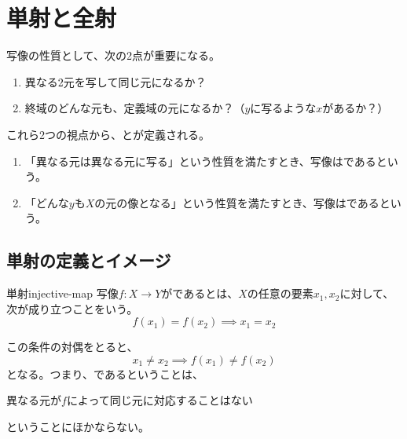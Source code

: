 \documentclass[../../../topic_linear-algebra]{subfiles}
\begin{document}
\sectionline
\section{単射と全射}

写像の性質として、次の2点が重要になる。
\begin{enumerate}[label=\romanlabel]
  \item 異なる2元を写して同じ元になるか？
  \item 終域のどんな元も、定義域の元になるか？（$y$に写るような$x$があるか？）
\end{enumerate}

これら2つの視点から、とが定義される。
\begin{enumerate}[label=\romanlabel]
  \item 「異なる元は異なる元に写る」という性質を満たすとき、写像はであるという。
  \item 「どんな$y$も$X$の元の像となる」という性質を満たすとき、写像はであるという。
\end{enumerate}

\subsection{単射の定義とイメージ}

\begin{definition}{単射}{injective-map}
  写像$f\colon X \to Y$がであるとは、$X$の任意の要素$x_1, x_2$に対して、次が成り立つことをいう。
  \begin{equation*}
    f(x_1) = f(x_2) \implies x_1 = x_2
  \end{equation*}
\end{definition}

この条件の対偶をとると、
\begin{equation*}
  x_1 \ne x_2 \implies f(x_1) \ne f(x_2)
\end{equation*}
となる。つまり、であるということは、
\begin{emphabox}
  \begin{spacebox}
    \begin{center}
      異なる元が$f$によって同じ元に対応することはない
    \end{center}
  \end{spacebox}
\end{emphabox}
ということにほかならない。
\end{document}

